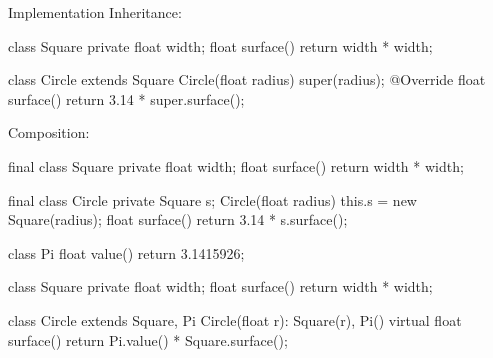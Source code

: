 \documentclass{article}
\begin{document}

\begin{pptWide}{2}
Implementation Inheritance:
\par
{\small\begin{ffcode}
class Square
  private float width;
  float surface()
    return width * width;

class Circle extends Square
  Circle(float radius)
    super(radius);
  @Override float surface()
    return 3.14 * super.surface();
\end{ffcode}
}
\par\columnbreak\par
Composition:
\par
{\small\begin{ffcode}
final class Square
  private float width;
  float surface()
    return width * width;

final class Circle
  private Square s;
  Circle(float radius)
    this.s = new Square(radius);
  float surface()
    return 3.14 * s.surface();
\end{ffcode}
}
\end{pptWide}
\plush{}


\begin{pptWide}{2}
\par
{\small\begin{ffcode}
class Pi
  float value()
    return 3.1415926;

class Square
  private float width;
  float surface()
    return width * width;

class Circle extends Square, Pi
  Circle(float r): Square(r), Pi() {}
  virtual float surface()
    return Pi.value() * Square.surface();
\end{ffcode}
}
\par\columnbreak\par
{}
\end{pptWide}
\plush{}
\end{document}
